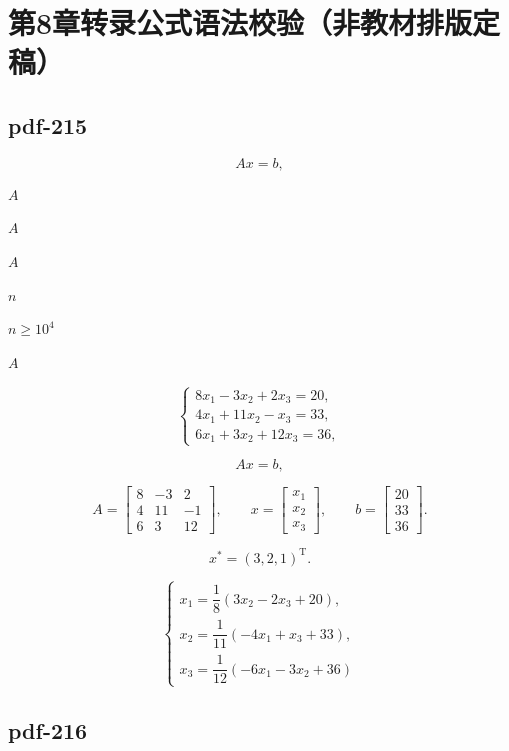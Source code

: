 \documentclass[UTF8,fontset=fandol]{ctexart}
\begin{document}
\section*{第8章转录公式语法校验（非教材排版定稿）}

\subsection*{pdf-215}

\[
Ax=b,
\tag{8.1.1}
\]

$A$\par

$A$\par

$A$\par

$n$\par

$n\geqslant10^4$\par

$A$\par

\[
\begin{cases}
8x_1-3x_2+2x_3=20,\\
4x_1+11x_2-x_3=33,\\
6x_1+3x_2+12x_3=36,
\end{cases}
\tag{8.1.2}
\]

\[
Ax=b,
\]

\[
A=\begin{bmatrix}8&-3&2\\4&11&-1\\6&3&12\end{bmatrix},\qquad
x=\begin{bmatrix}x_1\\x_2\\x_3\end{bmatrix},\qquad
b=\begin{bmatrix}20\\33\\36\end{bmatrix}.
\]

\[
x^*=(3,2,1)^{\mathrm T}.
\]

\[
\begin{cases}
x_1=\dfrac18(3x_2-2x_3+20),\\[4pt]
x_2=\dfrac1{11}(-4x_1+x_3+33),\\[4pt]
x_3=\dfrac1{12}(-6x_1-3x_2+36)
\end{cases}
\tag{8.1.3}
\]

\subsection*{pdf-216}
\end{document}
